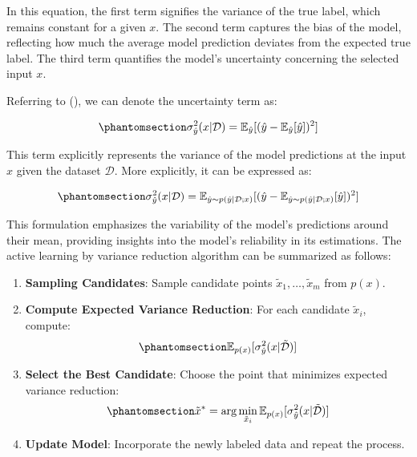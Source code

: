 \documentclass[
  letterpaper,
  numbers=noenddot,
  DIV=11]{scrreprt}
\providecommand{\tightlist}{%
  \setlength{\itemsep}{0pt}\setlength{\parskip}{0pt}}\usepackage{longtable,booktabs,array}
\theoremstyle{definition}
\theoremstyle{plain}
\theoremstyle{plain}
\theoremstyle{remark}
\begin{document}
In this equation, the first term signifies the variance of the true
label, which remains constant for a given \(x\). The second term
captures the bias of the model, reflecting how much the average model
prediction deviates from the expected true label. The third term
quantifies the model's uncertainty concerning the selected input \(x\).

Referring to (), we can denote the uncertainty term as:

\begin{equation}\phantomsection\label{eq-eq3.21}{
\sigma^2_{\hat{y}} (x | \mathcal{D}) = \mathbb{E}_{\hat{y}} [(\hat{y} - \mathbb{E}_{\hat{y}}[\hat{y}])^2]
}\end{equation}

This term explicitly represents the variance of the model predictions at
the input \(x\) given the dataset \(\mathcal{D}\). More explicitly, it
can be expressed as:

\begin{equation}\phantomsection\label{eq-eq3.22}{
\sigma^2_{\hat{y}} (x | \mathcal{D}) =  \mathbb{E}_{\hat{y} \sim p(\hat{y} | \mathcal{D}; x)} [(\hat{y} - \mathbb{E}_{\hat{y} \sim p(\hat{y} | \mathcal{D}; x)}[\hat{y}])^2]
}\end{equation}

This formulation emphasizes the variability of the model's predictions
around their mean, providing insights into the model's reliability in
its estimations. The active learning by variance reduction algorithm can
be summarized as follows:

\begin{enumerate}
\def\labelenumi{\arabic{enumi}.}
\tightlist
\item
  \textbf{Sampling Candidates}: Sample candidate points
  \(\tilde{x}_1, \dots, \tilde{x}_m\) from \(p(x)\).
\item
  \textbf{Compute Expected Variance Reduction}: For each candidate
  \(\tilde{x}_i\), compute:
  \begin{equation}\phantomsection\label{eq-eq3.23}{
  \mathbb{E}_{p(x)} [\sigma^2_{\hat{y}} (x | \tilde{\mathcal{D}})]
  }\end{equation}
\item
  \textbf{Select the Best Candidate}: Choose the point that minimizes
  expected variance reduction:
  \begin{equation}\phantomsection\label{eq-eq3.24}{
     \tilde{x}^* = \arg\min_{\tilde{x}_i} \mathbb{E}_{p(x)} [\sigma^2_{\hat{y}} (x | \tilde{\mathcal{D}})]
  }\end{equation}
\item
  \textbf{Update Model}: Incorporate the newly labeled data and repeat
  the process.
\end{enumerate}
\end{document}
